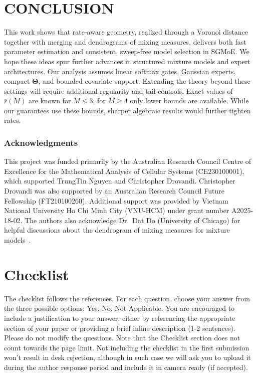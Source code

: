 \documentclass[twoside]{article}
\theoremstyle{plain}
\theoremstyle{definition}
\theoremstyle{plain}
\def\vTheta{{\bm{\Theta}}}
\begin{document}
\section{CONCLUSION}
\label{sec_conclusion}

This work shows that rate-aware geometry, realized through a Voronoi distance together with merging and dendrograms of mixing measures, delivers both fast parameter estimation and consistent, sweep-free model selection in SGMoE. We hope these ideas spur further advances in structured mixture models and expert architectures. Our analysis assumes linear softmax gates, Gaussian experts, compact \(\vTheta\), and bounded covariate support. Extending the theory beyond these settings will require additional regularity and tail controls. Exact values of \(\bar r(M)\) are known for \(M\le3\); for \(M\ge4\) only lower bounds are available. While our guarantees use these bounds, sharper algebraic results would further tighten rates. 

\newpage
\subsubsection*{Acknowledgments}
This project was funded primarily by the Australian Research Council Centre of Excellence for the Mathematical Analysis of Cellular Systems (CE230100001), which supported TrungTin Nguyen and Christopher Drovandi. Christopher Drovandi was also supported by an Australian Research Council Future Fellowship (FT210100260). Additional support was provided by Vietnam National University Ho Chi Minh City (VNU-HCM) under grant number A2025-18-02. The authors also acknowledge Dr.~Dat Do (University of Chicago) for helpful discussions about the dendrogram of mixing measures for mixture models~\citep{do_dendrogram_2024}.


% 
% 
% 


\section*{Checklist}


\iffalse
The checklist follows the references. For each question, choose your answer from the three possible options: Yes, No, Not Applicable.  You are encouraged to include a justification to your answer, either by referencing the appropriate section of your paper or providing a brief inline description (1-2 sentences). 
Please do not modify the questions.  Note that the Checklist section does not count towards the page limit. Not including the checklist in the first submission won't result in desk rejection, although in such case we will ask you to upload it during the author response period and include it in camera ready (if accepted).
\end{document}
